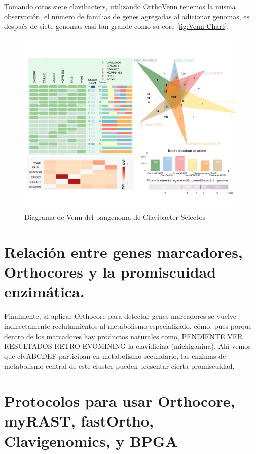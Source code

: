 \documentclass[12pt,twoside]{reedthesis}
\begin{document}
  Tomando otros siete clavibacters, utilizando OrthoVenn tenemos la misma
  observación, el número de familias de genes agregadas al adicionar
  genomas, es después de siete genomas casi tan grande como su core
  \autoref{fig:Venn-Chart}.
  
  \begin{figure}[h!tbp]
  \centering
  \includegraphics[angle = 0,scale = .6]{chapter1/Venn_chart.pdf}
  \caption[ X X]{\footnotesize{Diagrama de Venn del pangenoma de Clavibacter Selectos}}
  \label{fig:Venn-Chart}
  \end{figure}
  
  \section{Relación entre genes marcadores, Orthocores y la promiscuidad
  enzimática.}\label{relacion-entre-genes-marcadores-orthocores-y-la-promiscuidad-enzimatica.}
  
  Finalmente, al aplicar Orthocore para detectar genes marcadores se
  vuelve indirectamente reclutamientos al metabolismo especializado, cómo,
  pues porque dentro de los marcadores hay productos naturales como,
  PENDIENTE VER RESULTADOS RETRO-EVOMINING la clavidicina (michiganina).
  Ahí vemos que clvABCDEF participan en metabolismo secundario, las
  enzimas de metabolismo central de este cluster pueden presentar cierta
  promiscuidad.
  
  \section{Protocolos para usar Orthocore, myRAST, fastOrtho,
  Clavigenomics, y
  BPGA}\label{protocolos-para-usar-orthocore-myrast-fastortho-clavigenomics-y-bpga}
  
\end{document}
